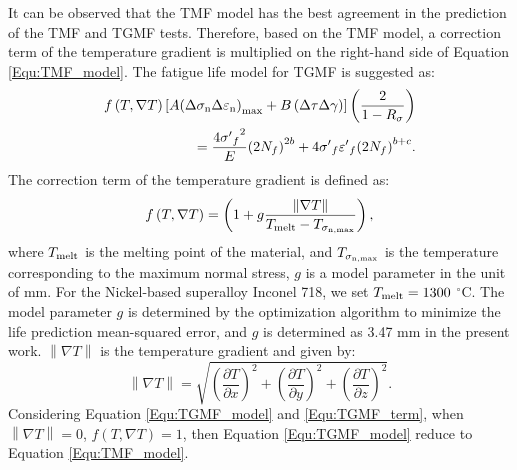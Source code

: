 \documentclass[preprint,5p,twocolumn,11pt,sort&compress]{elsarticle}
\begin{document}
It can be observed that the TMF model has the best agreement in the prediction of the TMF and TGMF tests.
Therefore, based on the TMF model, a correction term of the temperature gradient is multiplied on the right-hand side of Equation \eqref{Equ:TMF_model}. The fatigue life model for TGMF is suggested as:
\begin{equation}
\begin{aligned}
f\left( {T,\nabla T} \right)\left[ {A{{\left( {\Delta {\sigma _{\rm n}}\Delta {\varepsilon _{\rm n}}} \right)}_{\max }} + B\left( {\Delta \tau \Delta \gamma } \right)} \right]\left( {\frac{2}{{1 - {R_\sigma }}}} \right) \\ 
= \frac{{4{{\sigma '}_f}^2}}{E}{\left( {2{N_f}} \right)^{2b}} + 4{{\sigma '}_f}{{\varepsilon '}_f}{\left( {2{N_f}} \right)^{b + c}}.
\end{aligned}
\label{Equ:TGMF_model}
\end{equation}
The correction term of the temperature gradient is defined as:
\begin{equation}
f\left( {T,\nabla T} \right) = \left( {1 + g\frac{{\left\| {\nabla T} \right\|}}{{{T_{{\rm{melt}}}} - {T_{{\sigma _{\rm n,\max }}}}}}} \right),
\label{Equ:TGMF_term}
\end{equation}
where ${T_{{\rm{melt}}}}$ is the melting point of the material, and ${T_{{\sigma _{\rm n,\max }}}}$ is the temperature corresponding to the maximum normal stress, $g$ is a model parameter in the unit of mm. For the Nickel-based superalloy Inconel 718, we set ${T_{{\rm{melt}}}}=1300$ $^\circ$C. The model parameter $g$ is determined by the optimization algorithm to minimize the life prediction
mean-squared error, and $g$ is determined as 3.47 mm in the present work. ${\left\| {\nabla T} \right\|}$ is the temperature gradient and given by:
\begin{equation}
\left\| {\nabla T} \right\| = \sqrt {{{\left( {\frac{{\partial T}}{{\partial x}}} \right)}^2} + {{\left( {\frac{{\partial T}}{{\partial y}}} \right)}^2} + {{\left( {\frac{{\partial T}}{{\partial z}}} \right)}^2}}.
\end{equation}
Considering Equation \eqref{Equ:TGMF_model} and \eqref{Equ:TGMF_term}, when $\left\| {\nabla T} \right\|=0$, $f\left( {T,\nabla T} \right)=1$, then Equation \eqref{Equ:TGMF_model} reduce to Equation \eqref{Equ:TMF_model}.
\end{document}
